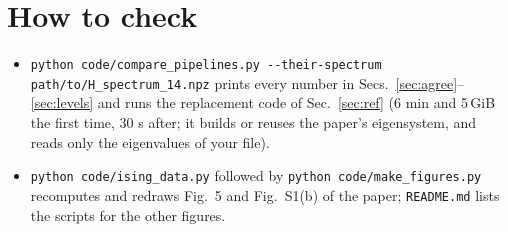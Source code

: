 \documentclass[11pt]{article}
\newcommand{\code}[1]{\texttt{#1}}
\begin{document}
\section{How to check}
\begin{itemize}\setlength{\itemsep}{2pt}
\item \code{python code/compare\_pipelines.py -{}-their-spectrum path/to/H\_spectrum\_14.npz} prints every number in Secs.~\ref{sec:agree}--\ref{sec:levels} and runs the replacement code of Sec.~\ref{sec:ref} (6 min and 5\,GiB the first time, 30 s after; it builds or reuses the paper's eigensystem, and reads only the eigenvalues of your file).
\item \code{python code/ising\_data.py} followed by \code{python code/make\_figures.py} recomputes and redraws Fig.~5 and Fig.~S1(b) of the paper; \code{README.md} lists the scripts for the other figures.
\end{itemize}
\end{document}
